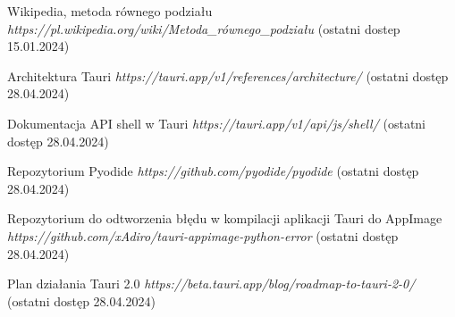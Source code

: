 \documentclass{SGGW-thesis}
\begin{document}
\begin{thebibliography}{9}
	Wikipedia, metoda równego podziału
	\textit{https://pl.wikipedia.org/wiki/Metoda\_równego\_podziału}
	(ostatni dostep 15.01.2024)
	
	Architektura Tauri
	\textit{https://tauri.app/v1/references/architecture/}
	(ostatni dostęp 28.04.2024)
	
	Dokumentacja API shell w Tauri
	\textit{https://tauri.app/v1/api/js/shell/}
	(ostatni dostęp 28.04.2024)
	

	
	Repozytorium Pyodide
	\textit{https://github.com/pyodide/pyodide}
	(ostatni dostęp 28.04.2024)
	
	Repozytorium do odtworzenia błędu w kompilacji aplikacji Tauri do AppImage
	\textit{https://github.com/xAdiro/tauri-appimage-python-error}
	(ostatni dostęp 28.04.2024)
	
	Plan działania Tauri 2.0
	\textit{https://beta.tauri.app/blog/roadmap-to-tauri-2-0/}
	(ostatni dostęp 28.04.2024)
	
	
	
	
	
	
	
	
	
\end{thebibliography}

\beforelastpage
\end{document}
